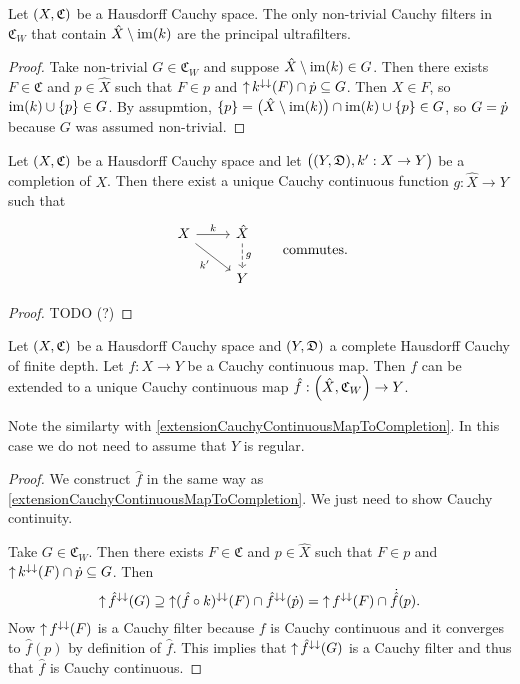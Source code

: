 \begin{lemma}
Let $\sSet{X, \mathfrak{C}}$ be a Hausdorff Cauchy space. The only non-trivial Cauchy filters in $\mathfrak{C}_W$ that contain $\hat{X}\setminus \operatorname{im}(k)$ are the principal ultrafilters.
\end{lemma}
\begin{proof}
Take non-trivial $G\in \mathfrak{C}_W$ and suppose $\hat{X}\setminus \operatorname{im}(k)\in G$. Then there exists $F\in\mathfrak{C}$ and $p\in \hat{X}$ such that $F\in p$ and $\operatorname{\uparrow} k^{\downarrow\downarrow}(F)\cap \dot{p}\subseteq G$. Then $X\in F$, so $\operatorname{im}(k)\cup\{p\} \in G$. By assupmtion, $\{p\} = \big(\hat{X}\setminus \operatorname{im}(k)\big)\cap \operatorname{im}(k)\cup\{p\} \in G$, so $G = \dot{p}$ because $G$ was assumed non-trivial.
\end{proof}

\begin{proposition}
Let $\sSet{X, \mathfrak{C}}$ be a Hausdorff Cauchy space and let $\sSet[\big]{\sSet{Y,\mathfrak{D}}, k': X\to Y}$ be a completion of $X$. Then there exist a unique Cauchy continuous function $g: \hat{X} \to Y$ such that
\[ \begin{tikzcd}[column sep=2.4em, row sep=1.8em]
X \ar[r, "k"] \ar[dr, swap, "{k'}"] & \hat{X} \ar[d, dashed, "g"] \\
{} & Y
\end{tikzcd} \qquad \text{commutes.} \]
\end{proposition}
\begin{proof}
TODO (?)
\end{proof}

\begin{proposition}
Let $\sSet{X, \mathfrak{C}}$ be a Hausdorff Cauchy space and $\sSet{Y,\mathfrak{D}}$ a complete Hausdorff Cauchy of finite depth. Let $f: X\to Y$ be a Cauchy continuous map. Then $f$ can be extended to a unique Cauchy continuous map $\hat{f}: \sSet{\hat{X}, \mathfrak{C}_W} \to Y$.
\end{proposition}
Note the similarty with \ref{extensionCauchyContinuousMapToCompletion}. In this case we do not need to assume that $Y$ is regular.
\begin{proof}
We construct $\hat{f}$ in the same way as \ref{extensionCauchyContinuousMapToCompletion}. We just need to show Cauchy continuity.

Take $G\in \mathfrak{C}_W$. Then there exists $F\in \mathfrak{C}$ and $p\in\hat{X}$ such that $F\in p$ and $\operatorname{\uparrow} k^{\downarrow\downarrow}(F)\cap \dot{p} \subseteq G$.
Then
\[ \operatorname{\uparrow} \hat{f}^{\downarrow\downarrow}(G) \supseteq \operatorname{\uparrow} (\hat{f}\circ k)^{\downarrow\downarrow}(F) \cap \hat{f}^{\downarrow\downarrow}(\dot{p}) = \operatorname{\uparrow} f^{\downarrow\downarrow}(F) \cap \dot{\hat{f}}(p). \]
Now $\operatorname{\uparrow} f^{\downarrow\downarrow}(F)$ is a Cauchy filter because $f$ is Cauchy continuous and it converges to $\hat{f}(p)$ by definition of $\hat{f}$. This implies that $\operatorname{\uparrow} \hat{f}^{\downarrow\downarrow}(G)$ is a Cauchy filter and thus that $\hat{f}$ is Cauchy continuous.
\end{proof}

